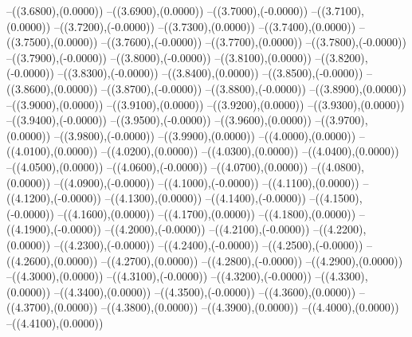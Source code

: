 {	--({\sx*(3.6800)},{\sy*(0.0000)})
	--({\sx*(3.6900)},{\sy*(0.0000)})
	--({\sx*(3.7000)},{\sy*(-0.0000)})
	--({\sx*(3.7100)},{\sy*(0.0000)})
	--({\sx*(3.7200)},{\sy*(-0.0000)})
	--({\sx*(3.7300)},{\sy*(0.0000)})
	--({\sx*(3.7400)},{\sy*(0.0000)})
	--({\sx*(3.7500)},{\sy*(0.0000)})
	--({\sx*(3.7600)},{\sy*(-0.0000)})
	--({\sx*(3.7700)},{\sy*(0.0000)})
	--({\sx*(3.7800)},{\sy*(-0.0000)})
	--({\sx*(3.7900)},{\sy*(-0.0000)})
	--({\sx*(3.8000)},{\sy*(-0.0000)})
	--({\sx*(3.8100)},{\sy*(0.0000)})
	--({\sx*(3.8200)},{\sy*(-0.0000)})
	--({\sx*(3.8300)},{\sy*(-0.0000)})
	--({\sx*(3.8400)},{\sy*(0.0000)})
	--({\sx*(3.8500)},{\sy*(-0.0000)})
	--({\sx*(3.8600)},{\sy*(0.0000)})
	--({\sx*(3.8700)},{\sy*(-0.0000)})
	--({\sx*(3.8800)},{\sy*(-0.0000)})
	--({\sx*(3.8900)},{\sy*(0.0000)})
	--({\sx*(3.9000)},{\sy*(0.0000)})
	--({\sx*(3.9100)},{\sy*(0.0000)})
	--({\sx*(3.9200)},{\sy*(0.0000)})
	--({\sx*(3.9300)},{\sy*(0.0000)})
	--({\sx*(3.9400)},{\sy*(-0.0000)})
	--({\sx*(3.9500)},{\sy*(-0.0000)})
	--({\sx*(3.9600)},{\sy*(0.0000)})
	--({\sx*(3.9700)},{\sy*(0.0000)})
	--({\sx*(3.9800)},{\sy*(-0.0000)})
	--({\sx*(3.9900)},{\sy*(0.0000)})
	--({\sx*(4.0000)},{\sy*(0.0000)})
	--({\sx*(4.0100)},{\sy*(0.0000)})
	--({\sx*(4.0200)},{\sy*(0.0000)})
	--({\sx*(4.0300)},{\sy*(0.0000)})
	--({\sx*(4.0400)},{\sy*(0.0000)})
	--({\sx*(4.0500)},{\sy*(0.0000)})
	--({\sx*(4.0600)},{\sy*(-0.0000)})
	--({\sx*(4.0700)},{\sy*(0.0000)})
	--({\sx*(4.0800)},{\sy*(0.0000)})
	--({\sx*(4.0900)},{\sy*(-0.0000)})
	--({\sx*(4.1000)},{\sy*(-0.0000)})
	--({\sx*(4.1100)},{\sy*(0.0000)})
	--({\sx*(4.1200)},{\sy*(-0.0000)})
	--({\sx*(4.1300)},{\sy*(0.0000)})
	--({\sx*(4.1400)},{\sy*(-0.0000)})
	--({\sx*(4.1500)},{\sy*(-0.0000)})
	--({\sx*(4.1600)},{\sy*(0.0000)})
	--({\sx*(4.1700)},{\sy*(0.0000)})
	--({\sx*(4.1800)},{\sy*(0.0000)})
	--({\sx*(4.1900)},{\sy*(-0.0000)})
	--({\sx*(4.2000)},{\sy*(-0.0000)})
	--({\sx*(4.2100)},{\sy*(-0.0000)})
	--({\sx*(4.2200)},{\sy*(0.0000)})
	--({\sx*(4.2300)},{\sy*(-0.0000)})
	--({\sx*(4.2400)},{\sy*(-0.0000)})
	--({\sx*(4.2500)},{\sy*(-0.0000)})
	--({\sx*(4.2600)},{\sy*(0.0000)})
	--({\sx*(4.2700)},{\sy*(0.0000)})
	--({\sx*(4.2800)},{\sy*(-0.0000)})
	--({\sx*(4.2900)},{\sy*(0.0000)})
	--({\sx*(4.3000)},{\sy*(0.0000)})
	--({\sx*(4.3100)},{\sy*(-0.0000)})
	--({\sx*(4.3200)},{\sy*(-0.0000)})
	--({\sx*(4.3300)},{\sy*(0.0000)})
	--({\sx*(4.3400)},{\sy*(0.0000)})
	--({\sx*(4.3500)},{\sy*(-0.0000)})
	--({\sx*(4.3600)},{\sy*(0.0000)})
	--({\sx*(4.3700)},{\sy*(0.0000)})
	--({\sx*(4.3800)},{\sy*(0.0000)})
	--({\sx*(4.3900)},{\sy*(0.0000)})
	--({\sx*(4.4000)},{\sy*(0.0000)})
	--({\sx*(4.4100)},{\sy*(0.0000)})
}
